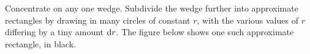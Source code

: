 \begin{eg}[Mass]
Concentrate on any one wedge. Subdivide the wedge further into
approximate rectangles by drawing in many circles of constant $r$, 
with the various values of $r$ differing by a tiny amount $\mathrm{d}r$.
The figure below shows one such approximate rectangle, in black.


\end{eg}
